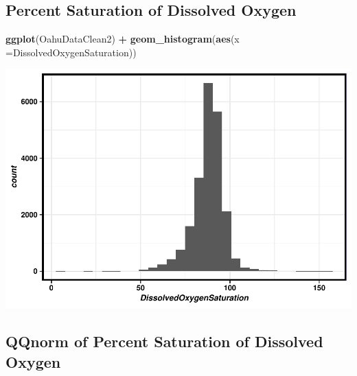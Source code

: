 \documentclass[12pt,]{article}
\newenvironment{Shaded}{\begin{snugshade}}{\end{snugshade}}
\newcommand{\KeywordTok}[1]{\textcolor[rgb]{0.13,0.29,0.53}{\textbf{#1}}}
\newcommand{\DataTypeTok}[1]{\textcolor[rgb]{0.13,0.29,0.53}{#1}}
\newcommand{\StringTok}[1]{\textcolor[rgb]{0.31,0.60,0.02}{#1}}
\newcommand{\OperatorTok}[1]{\textcolor[rgb]{0.81,0.36,0.00}{\textbf{#1}}}
\newcommand{\NormalTok}[1]{#1}
\begin{document}
\subsection{Percent Saturation of Dissolved
Oxygen}\label{percent-saturation-of-dissolved-oxygen}

\begin{Shaded}
\begin{Highlighting}[]
\KeywordTok{ggplot}\NormalTok{(OahuDataClean2) }\OperatorTok{+}
\StringTok{  }\KeywordTok{geom_histogram}\NormalTok{(}\KeywordTok{aes}\NormalTok{(}\DataTypeTok{x =}\NormalTok{DissolvedOxygenSaturation))}
\end{Highlighting}
\end{Shaded}

\includegraphics{Garcia_ENV872_Project_files/figure-latex/unnamed-chunk-36-1.pdf}

\subsection{QQnorm of Percent Saturation of Dissolved
Oxygen}\label{qqnorm-of-percent-saturation-of-dissolved-oxygen}

\begin{Shaded}
\end{Shaded}
\end{document}
